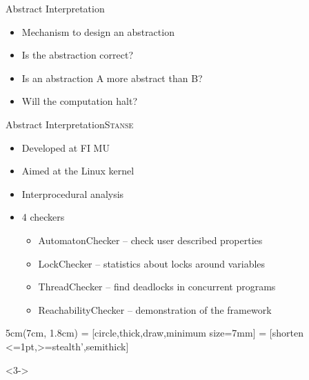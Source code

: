 \begin{frame}{Abstract Interpretation}

  \begin{itemize}[<+->]
    \item Mechanism to design an abstraction
    \item Is the abstraction correct?
    \item Is an abstraction A more abstract than B?
    \item Will the computation halt?
  \end{itemize}

\end{frame}

\begin{frame}{Abstract Interpretation}{\textsc{Stanse}}

  \begin{itemize}
    \item Developed at FI MU
    \item Aimed at the Linux kernel
    \item<+-> Interprocedural analysis

    \item<+-> 4 checkers
    \begin{itemize}[<+->]
      \item AutomatonChecker -- check user described properties
      \item LockChecker -- statistics about locks around variables
      \item ThreadChecker -- find deadlocks in concurrent programs
      \item ReachabilityChecker -- demonstration of the framework
    \end{itemize}
  \end{itemize}

  \begin{textblock*}{5cm}(7cm, 1.8cm)
     = [circle,thick,draw,minimum size=7mm]
     = [shorten <=1pt,>=stealth',semithick]
    \begin{uncoverenv}<3->
    \end{uncoverenv}
  \end{textblock*}

\end{frame}

